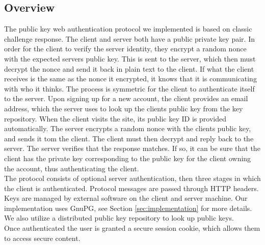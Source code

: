\documentclass[11pt]{article}
\begin{document}
\subsection{Overview} \label{subsec:overview}
The public key web authentication protocol we implemented is based on classic challenge response. The client and server both have a public private key pair. In order for the client to verify the server identity, they encrypt a random nonce with the expected servers public key. This is sent to the server, which then must decrypt the nonce and send it back in plain text to the client. If what the client receives is the same as the nonce it encrypted, it knows that it is communicating with who it thinks. The process is symmetric for the client to authenticate itself to the server. Upon signing up for a new account, the client provides an email address, which the server uses to look up the clients public key from the key repository. When the client visits the site, its public key ID is provided automatically. The server encrypts a random nonce with the clients public key, and sends it tom the client. The client must then decrypt and reply back to the server. The server verifies that the response matches. If so, it can be sure that the client has the private key corresponding to the public key for the client owning the account, thus authenticating the client.\\
The protocol consists of optional server authentication, then three stages in which the client is authenticated. Protocol messages are passed through HTTP headers. Keys are managed by external software on the client and server machine. Our implementation uses GnuPG, see Section \ref{sec:implementation} for more details. We also utilize a distributed public key repository to look up public keys.\\
Once authenticated the user is granted a secure session cookie, which allows them to access secure content.
\end{document}
